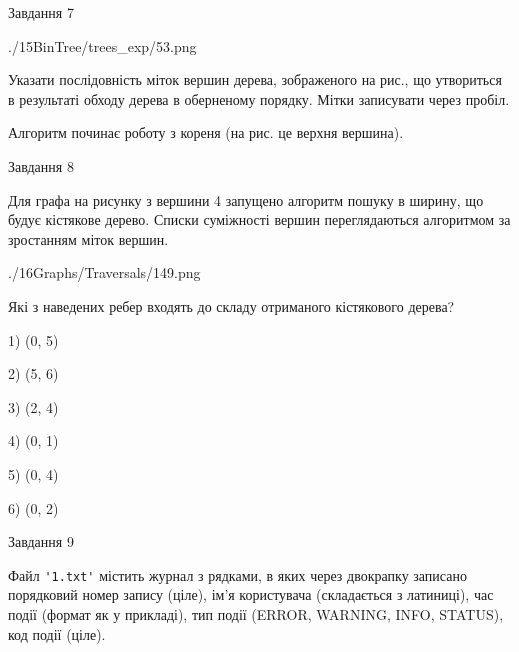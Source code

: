 \documentclass[12pt, ukrainian]{article}
\def\code#1{\Verb!#1!}
\begin{document}
{\vspace{10mm}\par

\newpage
\begin{minipage}[t]{9.7cm}
               
{\begin{center}Завдання {7}\end{center}}
\vspace{-6mm}

\begin{center}
	{./15BinTree/trees_exp/53.png}
\end{center}
Указати послідовність міток вершин дерева, зображеного на рис., що утвориться в результаті обходу дерева в оберненому порядку. Мітки записувати через пробіл.\par Алгоритм починає роботу з кореня (на рис. це верхня вершина).\par

\end{minipage}
\vline \hspace{8mm}
\begin{minipage}[t]{8.0cm}
               
{\begin{center}Завдання {8}\end{center}}
\vspace{-6mm}
Для графа на рисунку з вершини 4 запущено алгоритм пошуку в ширину, що будує кістякове дерево. Списки суміжності вершин переглядаються алгоритмом за зростанням міток вершин.\par
\begin{center}
	{./16Graphs/Traversals/149.png}
\end{center}
\par Які з наведених ребер входять до складу отриманого кістякового дерева?\par
1) (0, 5)\par
2) (5, 6)\par
3) (2, 4)\par
4) (0, 1)\par
5) (0, 4)\par
6) (0, 2)\par
{\vskip 15pt} \par

\end{minipage}

               
{\begin{center}Завдання {9}\end{center}}
\vspace{-6mm}
Файл \code{'1.txt'} містить журнал з рядками, в яких через двокрапку записано поряд\-ко\-вий номер запису (ціле), ім'я користувача (складається з латиниці), час події (фор\-мат як у прикладі), тип події (ERROR, WARNING, INFO, STATUS), код події (ціле).

}
\end{document}
